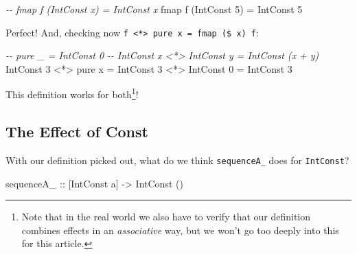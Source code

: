 \documentclass[]{article}
\newenvironment{Shaded}{}{}
\newcommand{\CommentTok}[1]{\textcolor[rgb]{0.38,0.63,0.69}{\textit{#1}}}
\newcommand{\DataTypeTok}[1]{\textcolor[rgb]{0.56,0.13,0.00}{#1}}
\newcommand{\DecValTok}[1]{\textcolor[rgb]{0.25,0.63,0.44}{#1}}
\newcommand{\FunctionTok}[1]{\textcolor[rgb]{0.02,0.16,0.49}{#1}}
\newcommand{\NormalTok}[1]{#1}
\newcommand{\OperatorTok}[1]{\textcolor[rgb]{0.40,0.40,0.40}{#1}}
\newcommand{\OtherTok}[1]{\textcolor[rgb]{0.00,0.44,0.13}{#1}}
\begin{document}
\begin{Shaded}
\begin{Highlighting}[]
\CommentTok{{-}{-} fmap f (IntConst x) = IntConst x}
\FunctionTok{fmap}\NormalTok{ f (}\DataTypeTok{IntConst} \DecValTok{5}\NormalTok{) }\OtherTok{=} \DataTypeTok{IntConst} \DecValTok{5}
\end{Highlighting}
\end{Shaded}

Perfect! And, checking now
\texttt{f\ \textless{}*\textgreater{}\ pure\ x\ =\ fmap\ (\$\ x)\ f}:

\begin{Shaded}
\begin{Highlighting}[]
\CommentTok{{-}{-} pure \_                    = IntConst 0}
\CommentTok{{-}{-} IntConst x \textless{}*\textgreater{} IntConst y = IntConst (x + y)}
\DataTypeTok{IntConst} \DecValTok{3} \OperatorTok{\textless{}*\textgreater{}} \FunctionTok{pure}\NormalTok{ x }\OtherTok{=} \DataTypeTok{IntConst} \DecValTok{3} \OperatorTok{\textless{}*\textgreater{}} \DataTypeTok{IntConst} \DecValTok{0}
                      \OtherTok{=} \DataTypeTok{IntConst} \DecValTok{3}
\end{Highlighting}
\end{Shaded}

\begin{Shaded}
\end{Shaded}

This definition works for both\footnote{Note that in the real world we also have
  to verify that our definition combines effects in an \emph{associative} way,
  but we won't go too deeply into this for this article.}!

\subsection{The Effect of Const}\label{the-effect-of-const}

With our definition picked out, what do we think \texttt{sequenceA\_} does for
\texttt{IntConst}?

\begin{Shaded}
\begin{Highlighting}[]
\OtherTok{sequenceA\_ ::}\NormalTok{ [}\DataTypeTok{IntConst}\NormalTok{ a] }\OtherTok{{-}\textgreater{}} \DataTypeTok{IntConst}\NormalTok{ ()}
\end{Highlighting}
\end{Shaded}
\end{document}
